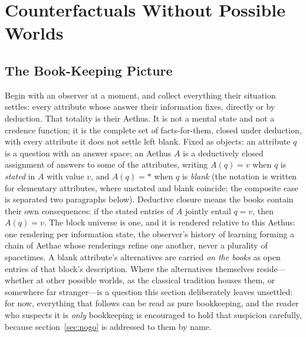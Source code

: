 \documentclass[11pt]{article}
\theoremstyle{definition}
\newcommand{\Aethus}{Aethus}
\begin{document}
\section{Counterfactuals Without Possible Worlds}\label{sec:semantics}

\subsection{The Book-Keeping Picture}\label{sec:books}

Begin with an observer at a moment, and collect everything their situation settles: every attribute whose answer their information fixes, directly or by deduction. That totality is their \Aethus. It is not a mental state and not a credence function; it is the complete set of facts-for-them, closed under deduction, with every attribute it does not settle left blank. Fixed as objects: an attribute $q$ is a question with an answer space; an \Aethus{} $A$ is a deductively closed assignment of answers to some of the attributes, writing $A(q)=v$ when $q$ is \emph{stated} in $A$ with value $v$, and $A(q)=\ast$ when $q$ is \emph{blank} (the notation is written for elementary attributes, where unstated and blank coincide; the composite case is separated two paragraphs below). Deductive closure means the books contain their own consequences: if the stated entries of $A$ jointly entail $q=v$, then $A(q)=v$. The block universe is one, and it is rendered relative to this \Aethus: one rendering per information state, the observer's history of learning forming a chain of Aethae whose renderings refine one another, never a plurality of spacetimes. A blank attribute's alternatives are carried \emph{on the books} as open entries of that block's description. Where the alternatives themselves reside---whether at other possible worlds, as the classical tradition houses them, or somewhere far stranger---is a question this section deliberately leaves unsettled: for now, everything that follows can be read as pure bookkeeping, and the reader who suspects it is \emph{only} bookkeeping is encouraged to hold that suspicion carefully, because section~\ref{sec:nogo} is addressed to them by name.
\end{document}

